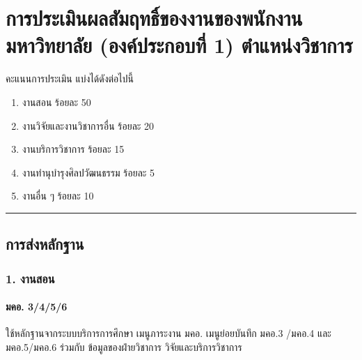 \documentclass[a4paper,12pt,english]{sphinxmanual}
\begin{document}
\chapter{การประเมินผลสัมฤทธิ์ของงานของพนักงานมหาวิทยาลัย (องค์ประกอบที่ 1)  ตำแหน่งวิชาการ}
\label{\detokenize{submission_part1:id1}}\label{\detokenize{submission_part1::doc}}
คะแนนการประเมิน แบ่งได้ดังต่อไปนี้
\begin{enumerate}
%
\item {} 
งานสอน ร้อยละ 50

\item {} 
งานวิจัยและงานวิชาการอื่น ร้อยละ 20

\item {} 
งานบริการวิชาการ ร้อยละ 15

\item {} 
งานทำนุบำรุงศิลปวัฒนธรรม ร้อยละ 5

\item {} 
งานอื่น ๆ ร้อยละ 10

\end{enumerate}


\bigskip\hrule\bigskip



\section{การส่งหลักฐาน}
\label{\detokenize{submission_part1:id2}}

\subsection{1. งานสอน}
\label{\detokenize{submission_part1:id3}}

\subsubsection{มคอ. 3/4/5/6}
\label{\detokenize{submission_part1:id4}}
ใช้หลักฐานจากระบบบริการการศึกษา เมนูภาระงาน มคอ. เมนูย่อยบันทึก มคอ.3 /มคอ.4  และ มคอ.5/มคอ.6 ร่วมกับ ข้อมูลของฝ่ายวิชาการ วิจัยและบริการวิชาการ
\end{document}
